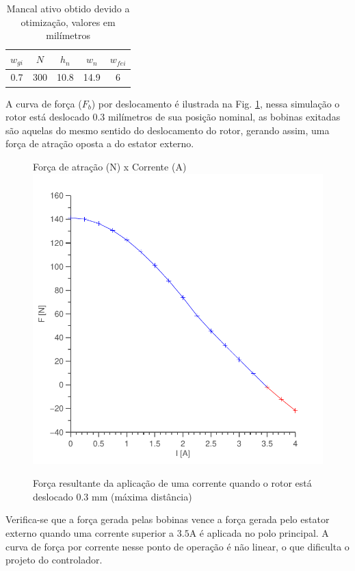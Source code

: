 \begin{table}[ht!]
	\centering
	\begin{tabular}{c c c c c}
		 $w_{gi}$ 	& $N$ & $h_n$ & $w_n$ & $w_{fei}$  \\ \hline \hline
		 0.7		& 300  	& 10.8 	& 14.9	& 6
	\end{tabular} 
	\caption{Mancal ativo obtido devido a otimização, valores em milímetros}
	\label{tab:ativo:resultado} 
\end{table}

A curva de força ($F_b$) por deslocamento é ilustrada na Fig. \ref{ativo_otimizado_fem_I_dx03}, nessa simulação o rotor está deslocado 0.3 milímetros de sua posição nominal, as bobinas exitadas são aquelas do mesmo sentido do deslocamento do rotor, gerando assim, uma força de atração oposta a do estator externo.  

\begin{figure}[ht!]
\centering
Força de atração (N) x Corrente (A)
\includegraphics[width=0.8\linewidth]{Figs/Simulacoes/Ativo/ativo_otimizado_fem_I_dx03}
\caption{Força resultante da aplicação de uma corrente quando o rotor está deslocado 0.3 mm (máxima distância)}
\label{ativo_otimizado_fem_I_dx03}
\end{figure}

Verifica-se que a força gerada pelas bobinas vence a força gerada pelo estator externo quando uma corrente superior a $3.5$A é aplicada no polo principal. A curva de força por corrente nesse ponto de operação é não linear, o que dificulta o projeto do controlador.


